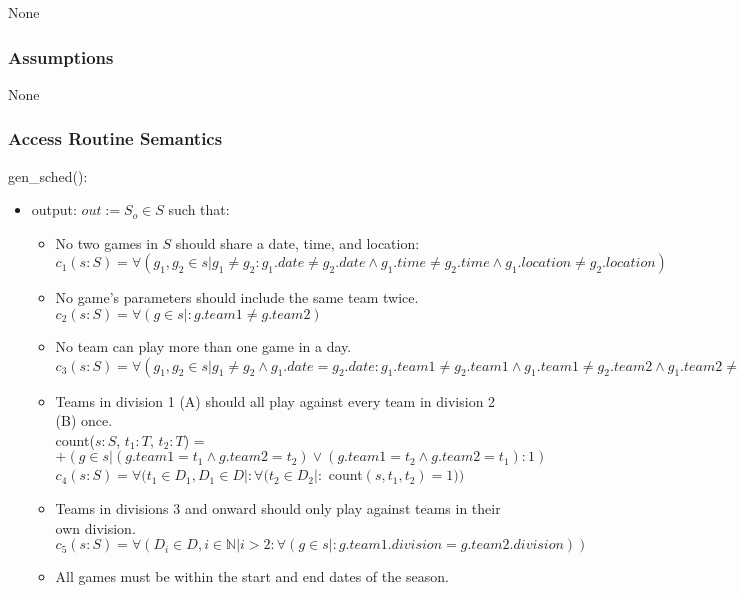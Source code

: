 \documentclass[12pt, titlepage]{article}
\begin{document}
None

\subsubsection{Assumptions}


None

\subsubsection{Access Routine Semantics}

\noindent gen\_sched():
\begin{itemize}
\item output: $out := S_o \in S$ such that:
\begin{itemize}
  \item No two games in $S$ should share a date, time, and location:\\
  $c_1(s:S) = \forall(g_1, g_2 \in s | g_1 \neq g_2 : g_1.date \neq
  g_2.date \land g_1.time \neq g_2.time \land g_1.location \neq g_2.location)$
  \item No game's parameters should include the same team twice.\\
  $c_2(s:S) = \forall (g \in s |: g.team1 \neq g.team2)$
  \item No team can play more than one game in a day.\\
  $c_3(s:S) = \forall (g_1, g_2 \in s |g_1 \neq g_2 \land g_1.date =
  g_2.date : g_1.team1 \neq g_2.team1 \land g_1.team1 \neq g_2.team2 \land
  g_1.team2 \neq g_2.team1 \land g_1.team2 \neq g_2.team2)$
  \item Teams in division 1 (A) should all play against every team in division
  2 (B) once.\\
  count($s:S$, $t_1:T$, $t_2:T$) = $+(g \in s | (g.team1 = t_1 \land
  g.team2 = t_2) \lor (g.team1 = t_2 \land g.team2 = t_1) : 1)$\\
  $c_4(s:S) = \forall (t_1 \in D_1, D_1 \in D |: \forall (t_2 \in D_2 |:$ count$(s, t_1,
  t_2) = 1))$
  \item Teams in divisions 3 and onward should only play against teams in
  their own division.\\
  $c_5(s:S) = \forall (D_i \in D, i \in \mathbb{N} | i > 2 : \forall (g \in s |:
  g.team1.division = g.team2.division))$
  \item All games must be within the start and end dates of the season.\\

\end{itemize}
\end{itemize}
\end{document}
